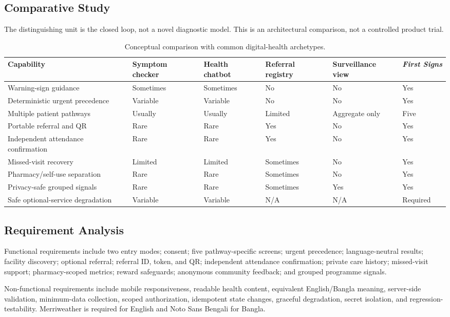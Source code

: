 \documentclass[12pt,onecolumn]{IEEEtran}
\newcommand{\product}{\textit{First Signs}}
\begin{document}
\subsection{Comparative Study}
The distinguishing unit is the closed loop, not a novel diagnostic model. This is an architectural comparison, not a controlled product trial.
\begin{table}[H]
\caption{Conceptual comparison with common digital-health archetypes.}\label{tab:comparison}\centering\scriptsize
\begin{tabularx}{\textwidth}{>{\raggedright\arraybackslash}p{}*{5}{>{\centering\arraybackslash}X}}
\toprule Capability & Symptom checker & Health chatbot & Referral registry & Surveillance view & \product \\\midrule
Warning-sign guidance & Sometimes & Sometimes & No & No & Yes \\
Deterministic urgent precedence & Variable & Variable & No & No & Yes \\
Multiple patient pathways & Usually & Usually & Limited & Aggregate only & Five \\
Portable referral and QR & Rare & Rare & Yes & No & Yes \\
Independent attendance confirmation & Rare & Rare & Yes & No & Yes \\
Missed-visit recovery & Limited & Limited & Sometimes & No & Yes \\
Pharmacy/self-use separation & Rare & Rare & Sometimes & No & Yes \\
Privacy-safe grouped signals & Rare & Rare & Sometimes & Yes & Yes \\
Safe optional-service degradation & Variable & Variable & N/A & N/A & Required \\
\bottomrule
\end{tabularx}
\end{table}

\subsection{Requirement Analysis}
Functional requirements include two entry modes; consent; five pathway-specific screens; urgent precedence; language-neutral results; facility discovery; optional referral; referral ID, token, and QR; independent attendance confirmation; private care history; missed-visit support; pharmacy-scoped metrics; reward safeguards; anonymous community feedback; and grouped programme signals.

Non-functional requirements include mobile responsiveness, readable health content, equivalent English/Bangla meaning, server-side validation, minimum-data collection, scoped authorization, idempotent state changes, graceful degradation, secret isolation, and regression-testability. Merriweather is required for English and Noto Sans Bengali for Bangla.
\end{document}
